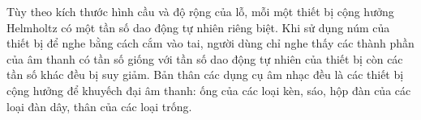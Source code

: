\begin{multicols}{2}
	\vskip 0.2cm
	\vskip 0.2cm
	Tùy theo kích thước hình cầu và độ rộng của lỗ, mỗi một thiết bị cộng hưởng Helmholtz có một tần số dao động tự nhiên riêng biệt. Khi sử dụng núm của thiết bị để nghe bằng cách cắm vào tai, người dùng chỉ nghe thấy các thành phần của âm thanh có tần số giống với tần số dao động tự nhiên của thiết bị còn các tần số khác đều bị suy giảm.
	Bản thân các dụng cụ âm nhạc đều là các thiết bị cộng hưởng để khuyếch đại âm thanh: ống của các loại kèn, sáo, hộp đàn của các loại đàn dây, thân của các loại trống. 

\end{multicols}
